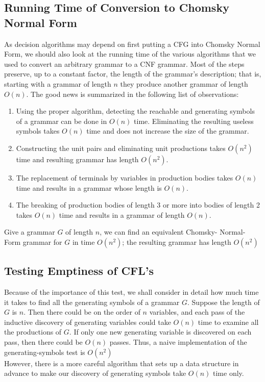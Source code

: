 \documentclass[]{article}
\begin{document}
  \subsection*{Running Time of Conversion to Chomsky Normal Form}
    As decision algorithms may depend on first putting a CFG into Chomsky Normal
    Form, we should also look at the running time of the various algorithms that
    we used to convert an arbitrary grammar to a CNF grammar. Most of the steps
    preserve, up to a constant factor, the length of the grammar's description;
    that is, starting with a grammar of length $n$ they produce another grammar
    of length $O(n)$. The good news is summarized in the following list of
    observations:
      \begin{enumerate}
        \item Using the proper algorithm, detecting the reachable and generating
        symbols of a grammar can be done in $O(n)$ time. Eliminating the
        resulting useless symbols takes $O(n)$ time and does not increase the
        size of the grammar.
        \item Constructing the unit pairs and eliminating unit productions takes
        $O(n^2)$ time and resulting grammar has length $O(n^2)$.
        \item The replacement of terminals by variables in production bodies
        takes $O(n)$ time and results in a grammar whose length is $O(n)$.
        \item The breaking of production bodies of length 3 or more into bodies
        of length 2 takes $O(n)$ time and results in a grammar of length $O(n)$.
      \end{enumerate}
      \begin{thm}
        Give a grammar $G$ of length $n$, we can find an equivalent Chomsky-
        Normal-Form grammar for $G$ in time $O(n^2)$; the resulting grammar has
        length $O(n^2)$
      \end{thm}

  \subsection*{Testing Emptiness of CFL's}
    Because of the importance of this test, we shall consider in detail how much
    time it takes to find all the generating symbols of a grammar $G$. Suppose
    the length of $G$ is $n$. Then there could be on the order of $n$ variables,
    and each pass of the inductive discovery of generating variables could take
    $O(n)$ time to examine all the productions of $G$. If only one new
    generating variable is discovered on each pass, then there could be $O(n)$
    passes. Thus, a naive implementation of the generating-symbols test is
    $O(n^2)$ \\
    \indent However, there is a more careful algorithm that sets up a data
    structure in advance to make our discovery of generating symbols take $O(n)$
    time only.
\end{document}
